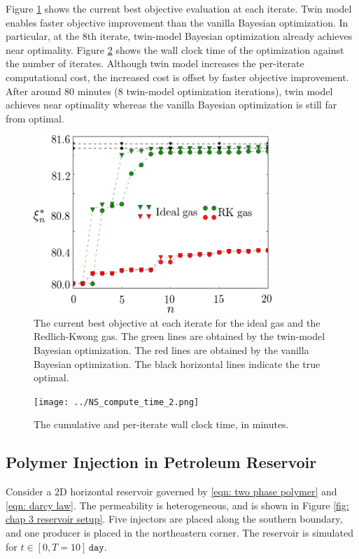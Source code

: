 Figure \ref{fig: NS opt obj 2} shows the current best objective evaluation at each iterate.
Twin model enables faster objective improvement than the vanilla Bayesian optimization.
In particular, at the $8$th iterate, twin-model Bayesian optimization already achieves near optimality.
Figure \ref{fig: NS opt wall clock} shows the wall clock time of the optimization
against the number of iterates. Although twin model increases the per-iterate computational
cost, the increased cost is offset by faster objective improvement. After around $80$
minutes (8 twin-model optimization iterations), twin model achieves near optimality whereas the vanilla 
Bayesian optimization is still far from optimal.\\

\begin{figure}[htbp]\begin{center}
    \includegraphics[width=9cm]{../Ubend_combined_new_2.png}
    \caption{The current best objective at each iterate for the ideal gas and the 
             Redlich-Kwong gas. The green lines are
             obtained by the twin-model Bayesian optimization. The red lines are
             obtained by the vanilla Bayesian optimization. The black horizontal lines
             indicate the true optimal.}
    \label{fig: NS opt obj 2}
\end{center}\end{figure}

\begin{figure}[htbp]\begin{center}
    \texttt{[image: ../NS\_compute\_time\_2.png]}
    \caption{The cumulative and per-iterate wall clock time, in minutes.}
    \label{fig: NS opt wall clock}
\end{center}\end{figure}


\subsection{Polymer Injection in Petroleum Reservoir}
\label{sec: chap 3 reservoir}
Consider a 2D horizontal reservoir governed by \eqref{eqn: two phase polymer}
and \eqref{eqn: darcy law}. The permeability is heterogeneous, and is shown in
Figure \ref{fig: chap 3 reservoir setup}. Five injectors 
are placed along the southern boundary, and one producer is placed in the northeastern
corner. The reservoir is simulated for $t\in[0,T=10]\,\texttt{day}$.\\

